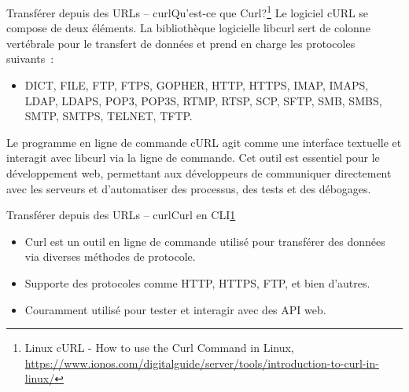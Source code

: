 \documentclass{beamer}
\begin{document}
    \begin{frame}{Transférer depuis des URLs – curl}{Qu'est-ce que Curl?\footnote{\label{linux-curl}Linux cURL - How to use the Curl Command in Linux, \url{https://www.ionos.com/digitalguide/server/tools/introduction-to-curl-in-linux/}}}
        Le logiciel cURL se compose de deux éléments.
        La bibliothèque logicielle libcurl sert de colonne vertébrale pour le transfert de données et prend en charge les protocoles suivants~:
        \begin{itemize}
            \item DICT, FILE, FTP, FTPS, GOPHER, HTTP, HTTPS, IMAP, IMAPS, LDAP, LDAPS, POP3, POP3S, RTMP, RTSP, SCP, SFTP, SMB, SMBS, SMTP, SMTPS, TELNET, TFTP.
        \end{itemize}
        Le programme en ligne de commande cURL agit comme une interface textuelle et interagit avec libcurl via la ligne de commande. Cet outil est essentiel pour le développement web, permettant aux développeurs de communiquer directement avec les serveurs et d'automatiser des processus, des tests et des débogages.
    \end{frame}

    \begin{frame}{Transférer depuis des URLs – curl}{Curl en CLI\cref{linux-curl}}
        \begin{itemize}
            \item Curl est un outil en ligne de commande utilisé pour transférer des données via diverses méthodes de protocole.
            \item Supporte des protocoles comme HTTP, HTTPS, FTP, et bien d'autres.
            \item Couramment utilisé pour tester et interagir avec des API web.
        \end{itemize}
    \end{frame}
\end{document}
